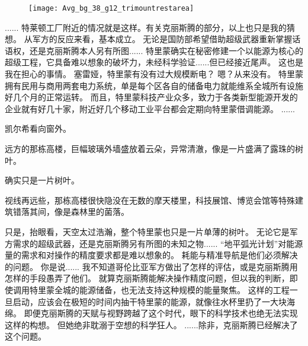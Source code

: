 \documentclass[openany]{book}
\begin{document}
\begin{figure}[h]
    \centering
    \texttt{[image: Avg\_bg\_38\_g12\_trimountrestarea]}
\end{figure}
\begin{dialogue}
     ......
     特莱顿工厂附近的情况就是这样。有关克丽斯腾的部分，以上也只是我的猜想。
     从军方的反应来看，基本成立。
     无论是国防部希望借助超级武器重新掌握话语权，还是克丽斯腾本人另有所图......
     特里蒙确实在秘密修建一个以能源为核心的超级工程，它具备难以想象的破坏力，未经科学验证......但已经接近尾声。
     这也是我在担心的事情。
     塞雷娅，特里蒙有没有过大规模断电？
     嗯？从来没有。
     特里蒙拥有民用与商用两套电力系统，单是每个区各自的储备电力就能维系全城所有设施好几个月的正常运转。
     而且，特里蒙科技产业众多，致力于各类新型能源开发的企业就有好几十家，附近好几个移动工业平台都会定期向特里蒙借调能源。
     ......\par
    凯尔希看向窗外。\par
    远方的那栋高楼，巨幅玻璃外墙盛放着云朵，异常清澈，像是一片盛满了露珠的树叶。\par
    确实只是一片树叶。\par
    视线再远些，那栋高楼很快隐没在无数的摩天楼里，科技展馆、博览会馆等特殊建筑错落其间，像是森林里的菌落。\par
    只是，抬眼看，天空太过浩瀚，整个特里蒙也只是一片单薄的树叶。
     无论它是军方需求的超级武器，还是克丽斯腾另有所图的未知之物......
     “地平弧光计划”对能源量的需求和对操作的精度要求都是难以想象的。
     耗能与精准导航是他们必须解决的问题。
     你是说......
     我不知道哥伦比亚军方做出了怎样的评估，或是克丽斯腾用怎样的手段愚弄了他们。
     就算克丽斯腾能解决操作精度问题，但以我的判断，即使调用特里蒙全城的能源储备，也无法支持这种规模的能量聚焦。
     这样的工程一旦启动，应该会在极短的时间内抽干特里蒙的能源，就像往水杯里扔了一大块海绵。
     即便克丽斯腾的天赋与视野跨越了这个时代，眼下的科学技术也绝无法实现这样的构想。
     但她绝非耽溺于空想的科学狂人。
     ......除非，克丽斯腾已经解决了这个问题。
\end{dialogue}
\end{document}
